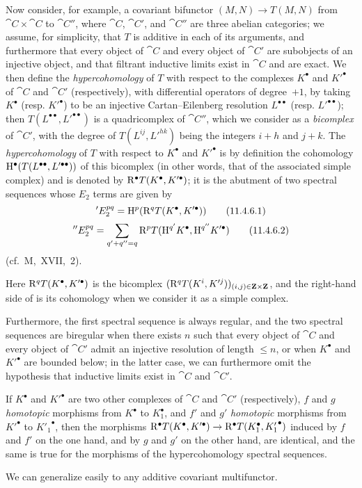 \begin{env}[11.4.6]
\label{0.11.4.6}
Now consider, for example, a covariant bifunctor $(M, N) \rightarrow T(M, N)$ from $\cat{C} \times \cat{C}$ to $\cat{C}''$, where $\cat{C}$, $\cat{C}'$, and $\cat{C}''$ are three abelian categories;
we assume, for simplicity, that $T$ is additive in each of its arguments, and furthermore that every object of $\cat{C}$ and every object of $\cat{C}'$ are subobjects of an injective object, 
and that filtrant inductive limits exist in $\cat{C}$ and are exact.
We then define the \emph{hypercohomology} of $T$ with respect to the complexes $K^\bullet$ and $K'^\bullet$ of $\cat{C}$ and $\cat{C}'$ (respectively), with differential operators of degree~$+1$, by taking $K^\bullet$ (resp. $K'^\bullet$) to be an injective Cartan--Eilenberg resolution $L^{\bullet\bullet}$ (resp. $L'^{\bullet\bullet}$);
then $T(L^{\bullet\bullet}, L'^{\bullet\bullet})$ is a quadricomplex of $\cat{C}''$, which we consider as a \emph{bicomplex} of $\cat{C}'$, with the degree of $T(L^{ij}, L'^{hk})$ being the integers $i+h$ and $j+k$.
The \emph{hypercohomology} of $T$ with respect to $K^\bullet$ and $K'^\bullet$ is by definition the cohomology $\mathrm{H}^\bullet(T(L^{\bullet\bullet}, L'^{\bullet\bullet}))$ of this bicomplex  (in other words, that of the associated simple complex) and is denoted by $\mathrm{R}^\bullet T(K^\bullet, K'^\bullet)$;
it is the abutment of two spectral sequences whose $E_2$ terms are given by
\[
\label{0.11.4.6.1}
  'E_2^{pq}
  = \mathrm{H}^p(\mathrm{R}^q T(K^\bullet, K'^\bullet))
\tag{11.4.6.1}
\]
\[
\label{0.11.4.6.2}
  ''E_2^{pq}
  = \sum_{q'+q''=q}\mathrm{R}^p T(\mathrm{H}^{q'}{K^\bullet},\mathrm{H}^{q''}{K'^\bullet})
\tag{11.4.6.2}
\]
(cf.~M,~XVII,~2).

Here $\mathrm{R}^q T(K^\bullet, K'^\bullet)$ is the bicomplex $(\mathrm{R}^q T(K^i, K'^j))_{(i,j)\in \mathbf{Z}\times \mathbf{Z}}$, and the right-hand side of  is its cohomology when we consider it as a simple complex.

Furthermore, the first spectral sequence is always regular, and the two spectral sequences are biregular when there exists $n$ such that every object of $\cat{C}$ and every object of $\cat{C}'$ admit an injective resolution of length $\leq n$, or when $K^\bullet$ and $K'^\bullet$ are bounded below;
in the latter case, we can furthermore omit the hypothesis that inductive limits exist in $\cat{C}$ and $\cat{C}'$.

If $K^\bullet$ and $K'^\bullet$ are two other complexes of $\cat{C}$ and $\cat{C}'$ (respectively), $f$ and $g$ \emph{homotopic} morphisms from $K^\bullet$ to $K_1^\bullet$, 
and $f'$ and $g'$ \emph{homotopic} morphisms from $K'^\bullet$ to ${K'_1}^\bullet$, then the morphisms $\mathrm{R}^\bullet  T(K^\bullet, K'^\bullet) \rightarrow \mathrm{R}^\bullet  T(K_1^\bullet, {K'_1}^\bullet)$ induced by $f$ and $f'$ on the one hand, and by $g$ and $g'$ on the other hand, are identical, and the same is true for the morphisms of the hypercohomology spectral sequences.

We can generalize easily to any additive covariant multifunctor.
\end{env}

